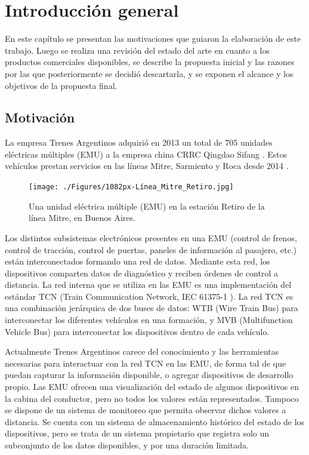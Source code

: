 \chapter{Introducción general}

En este capítulo se presentan las motivaciones que guiaron la elaboración de este trabajo. Luego se realiza una revisión del estado del arte en cuanto a los productos comerciales disponibles, se describe la propuesta inicial y las razones por las que posteriormente se decidió descartarla, y se exponen el alcance y los objetivos de la propuesta final.

\label{cap:IntroGeneral}

\section{Motivación}

La empresa Trenes Argentinos \cite{web:sofse} adquirió en 2013 un total de 705 unidades eléctricas múltiples (EMU) a la empresa china CRRC Qingdao Sifang \cite{web:sifang} \cite{licitacion1}. Estos vehículos prestan servicios en las líneas Mitre, Sarmiento y Roca desde 2014 \cite{emu:roca} \cite{emu:mitre-sarmiento}.

\begin{figure}[htbp]
	\centering
	\texttt{[image: ./Figures/1082px-Línea\_Mitre\_Retiro.jpg]}
	\caption[Unidad eléctrica múltiple (EMU)]{Una unidad eléctrica múltiple (EMU) en la estación Retiro de la línea Mitre, en Buenos Aires.\footnotemark}
	\label{fig:emu}
\end{figure}

Los distintos subsistemas electrónicos presentes en una EMU (control de frenos, control de tracción, control de puertas, paneles de información al pasajero, etc.) están interconectados formando una red de datos. Mediante esta red, los dispositivos comparten datos de diagnóstico y reciben órdenes de control a distancia. La red interna que se utiliza en las EMU es una implementación del estándar TCN (Train Communication Network, IEC 61375-1 \cite{iec61375-1}). La red TCN es una combinación jerárquica de dos buses de datos: WTB (Wire Train Bus) para interconectar los diferentes vehículos en una formación, y MVB (Multifunction Vehicle Bus) para interconectar los dispositivos dentro de cada vehículo.

Actualmente Trenes Argentinos carece del conocimiento y las herramientas necesarias para interactuar con la red TCN en las EMU, de forma tal de que puedan capturar la información disponible, o agregar dispositivos de desarrollo propio.
Las EMU ofrecen una visualización del estado de algunos dispositivos en la cabina del conductor, pero no todos los valores están representados.
Tampoco se dispone de un sistema de monitoreo que permita observar dichos valores a distancia.
Se cuenta con un sistema de almacenamiento histórico del estado de los dispositivos, pero se trata de un sistema propietario que registra solo un subconjunto de los datos disponibles, y por una duración limitada.

